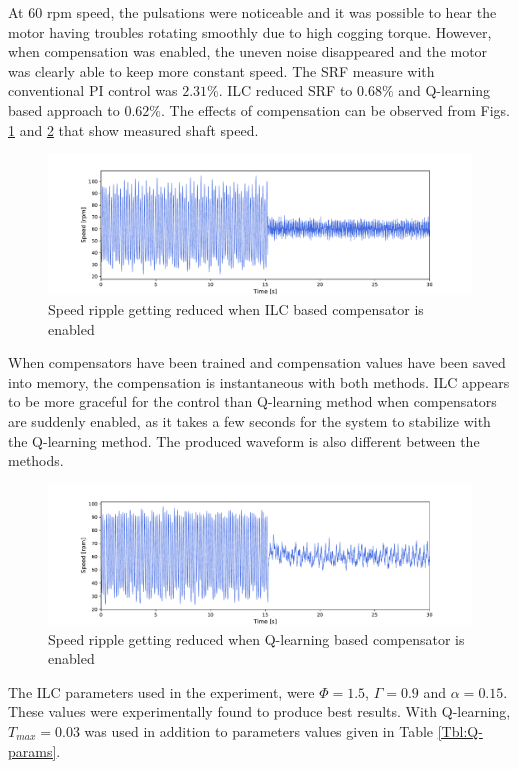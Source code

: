 At $60$ rpm speed, the pulsations were noticeable and it was possible to hear the motor having troubles rotating smoothly due to high cogging torque. However, when compensation was enabled, the uneven noise disappeared and the motor was clearly able to keep more constant speed. The SRF measure with conventional PI control was $2.31\%$. ILC reduced SRF to $0.68\%$ and Q-learning based approach to $0.62\%$. The effects of compensation can be observed from Figs. \ref{fig:ilc-on-off} and \ref{fig:qlr-off-on} that show measured shaft speed.
\begin{figure}[b] 
    \centering
    \includegraphics[width=\textwidth]{images/ILC-SDM251-OFF-ON.pdf}
    \caption{Speed ripple getting reduced when ILC based compensator is enabled}
    \label{fig:ilc-on-off}
\end{figure}
When compensators have been trained and compensation values have been saved into memory, the compensation is instantaneous with both methods. ILC appears to be more graceful for the control than Q-learning method when compensators are suddenly enabled, as it takes a few seconds for the system to stabilize with the Q-learning method. The produced waveform is also different between the methods.
\begin{figure}[tb] 
    \centering
    \includegraphics[width=\textwidth]{images/QLR-SDM251-OFF-ON.pdf}
    \caption{Speed ripple getting reduced when Q-learning based compensator is enabled}
    \label{fig:qlr-off-on}
\end{figure}

The ILC parameters used in the experiment, were $\Phi = 1.5$, $\Gamma = 0.9$ and $ \alpha = 0.15$. These values were experimentally found to produce best results. With Q-learning, $T_{max} = 0.03$ was used in addition to parameters values given in Table \ref{Tbl:Q-params}.

